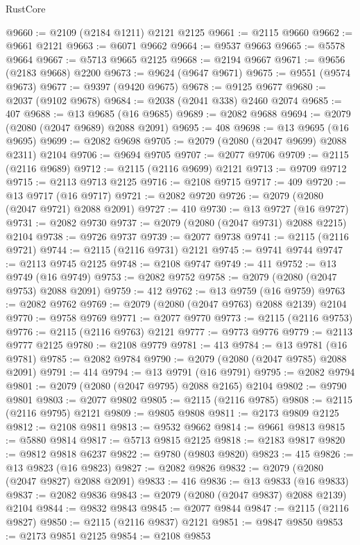 \begin{lexlean}{RustCore}
\begin{coremodule}
@9660 := @2109 (@2184 @1211) @2121 @2125
@9661 := @2115 @9660
@9662 := @9661 @2121
@9663 := @6071 @9662
@9664 := @9537 @9663
@9665 := @5578 @9664
@9667 := @5713 @9665 @2125
@9668 := @2194 @9667
@9671 := @9656 (@2183 @9668) @2200
@9673 := @9624 (@9647 @9671)
@9675 := @9551 (@9574 @9673)
@9677 := @9397 (@9420 @9675)
@9678 := @9125 @9677
@9680 := @2037 (@9102 @9678)
@9684 := @2038 (@2041 @338) @2460 @2074
@9685 := 407
@9688 := @13 @9685 (@16 @9685)
@9689 := @2082 @9688
@9694 := @2079 (@2080 (@2047 @9689) @2088 @2091)
@9695 := 408
@9698 := @13 @9695 (@16 @9695)
@9699 := @2082 @9698
@9705 := @2079 (@2080 (@2047 @9699) @2088 @2311) @2104
@9706 := @9694 @9705
@9707 := @2077 @9706
@9709 := @2115 (@2116 @9689)
@9712 := @2115 (@2116 @9699) @2121
@9713 := @9709 @9712
@9715 := @2113 @9713 @2125
@9716 := @2108 @9715
@9717 := 409
@9720 := @13 @9717 (@16 @9717)
@9721 := @2082 @9720
@9726 := @2079 (@2080 (@2047 @9721) @2088 @2091)
@9727 := 410
@9730 := @13 @9727 (@16 @9727)
@9731 := @2082 @9730
@9737 := @2079 (@2080 (@2047 @9731) @2088 @2215) @2104
@9738 := @9726 @9737
@9739 := @2077 @9738
@9741 := @2115 (@2116 @9721)
@9744 := @2115 (@2116 @9731) @2121
@9745 := @9741 @9744
@9747 := @2113 @9745 @2125
@9748 := @2108 @9747
@9749 := 411
@9752 := @13 @9749 (@16 @9749)
@9753 := @2082 @9752
@9758 := @2079 (@2080 (@2047 @9753) @2088 @2091)
@9759 := 412
@9762 := @13 @9759 (@16 @9759)
@9763 := @2082 @9762
@9769 := @2079 (@2080 (@2047 @9763) @2088 @2139) @2104
@9770 := @9758 @9769
@9771 := @2077 @9770
@9773 := @2115 (@2116 @9753)
@9776 := @2115 (@2116 @9763) @2121
@9777 := @9773 @9776
@9779 := @2113 @9777 @2125
@9780 := @2108 @9779
@9781 := 413
@9784 := @13 @9781 (@16 @9781)
@9785 := @2082 @9784
@9790 := @2079 (@2080 (@2047 @9785) @2088 @2091)
@9791 := 414
@9794 := @13 @9791 (@16 @9791)
@9795 := @2082 @9794
@9801 := @2079 (@2080 (@2047 @9795) @2088 @2165) @2104
@9802 := @9790 @9801
@9803 := @2077 @9802
@9805 := @2115 (@2116 @9785)
@9808 := @2115 (@2116 @9795) @2121
@9809 := @9805 @9808
@9811 := @2173 @9809 @2125
@9812 := @2108 @9811
@9813 := @9532 @9662
@9814 := @9661 @9813
@9815 := @5880 @9814
@9817 := @5713 @9815 @2125
@9818 := @2183 @9817
@9820 := @9812 @9818 @6237
@9822 := @9780 (@9803 @9820)
@9823 := 415
@9826 := @13 @9823 (@16 @9823)
@9827 := @2082 @9826
@9832 := @2079 (@2080 (@2047 @9827) @2088 @2091)
@9833 := 416
@9836 := @13 @9833 (@16 @9833)
@9837 := @2082 @9836
@9843 := @2079 (@2080 (@2047 @9837) @2088 @2139) @2104
@9844 := @9832 @9843
@9845 := @2077 @9844
@9847 := @2115 (@2116 @9827)
@9850 := @2115 (@2116 @9837) @2121
@9851 := @9847 @9850
@9853 := @2173 @9851 @2125
@9854 := @2108 @9853

\end{coremodule}
\end{lexlean}

